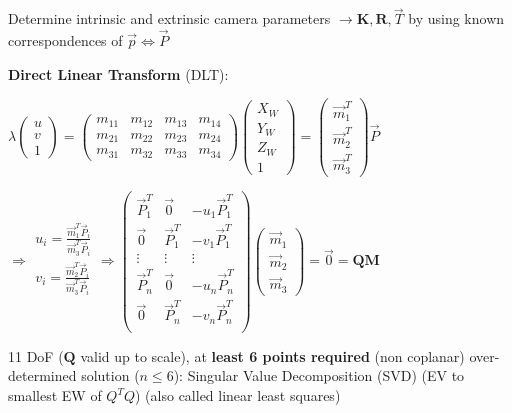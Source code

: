 \documentclass[fontsize=6pt]{scrartcl}
\newcommand{\mat}[1]{\mathbf{#1}}
\begin{document}
\begin{multicols*}{4}
Determine intrinsic and extrinsic camera parameters $\rightarrow \mat K, \mat R, \vec T$ by using known correspondences of $\vec p \Leftrightarrow \vec P$

\textbf{Direct Linear Transform} (DLT): 

$\lambda\begin{pmatrix}
u\\
v\\
1
\end{pmatrix}
=
\begin{pmatrix}
m_{11} & m_{12} & m_{13} & m_{14}\\
m_{21} & m_{22} & m_{23} & m_{24}\\
m_{31} & m_{32} & m_{33} & m_{34}
\end{pmatrix}
\begin{pmatrix}
X_W\\
Y_W\\
Z_W\\
1
\end{pmatrix}
=
\begin{pmatrix}
\vec{m}_1^T\\
\vec{m}_2^T\\
\vec{m}_3^T
\end{pmatrix}
\vec{P}
$

$
\Rightarrow
\begin{matrix}
u_i = \frac{\vec{m}_1^T\vec{P}_i}{\vec{m}_3^T\vec{P}_i}\\
v_i = \frac{\vec{m}_2^T\vec{P}_i}{\vec{m}_3^T\vec{P}_i}\\
\end{matrix}
\Rightarrow
\begin{pmatrix}
\vec P_1^T &  \vec 0 & -u_1 \vec{P}_1^T\\
\vec 0 &  \vec P_1^T & -v_1 \vec{P}_1^T\\
\vdots & \vdots & \vdots\\
\vec P_n^T &  \vec 0 & -u_n \vec{P}_n^T\\
\vec 0 &  \vec P_n^T & -v_n \vec{P}_n^T\\
\end{pmatrix}
\begin{pmatrix}
\vec{m}_1\\
\vec{m}_2\\
\vec{m}_3
\end{pmatrix}
=\vec{0}=\mat Q \mat M
$

11 DoF ($\mat Q$ valid up to scale), at \textbf{least 6 points required} (non coplanar)
over-determined solution ($n\leq6$): Singular Value Decomposition (SVD) (EV to smallest EW of $Q^T Q$) (also called linear least squares)


\end{multicols*}
\end{document}
